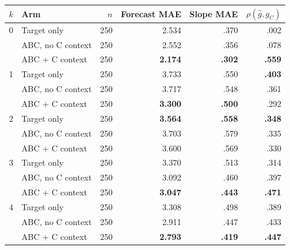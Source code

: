 \begin{center}
\begin{minipage}{\linewidth}
\centering
{}
\label{tab:coin-city-recovery-gemini}
\small
\begin{tabular}{c l r r r r}
\toprule
$k$ & Arm & $n$ & Forecast MAE & Slope MAE & $\rho(\hat g,g_C)$ \\
\midrule
0 & Target only & 250 & 2.534 & .370 & .002 \\
  & ABC, no C context & 250 & 2.552 & .356 & .078 \\
  & ABC + C context & 250 & \textbf{2.174} & \textbf{.302} & \textbf{.559} \\
\midrule
1 & Target only & 250 & 3.733 & .550 & \textbf{.403} \\
  & ABC, no C context & 250 & 3.717 & .548 & .361 \\
  & ABC + C context & 250 & \textbf{3.300} & \textbf{.500} & .292 \\
\midrule
2 & Target only & 250 & \textbf{3.564} & \textbf{.558} & \textbf{.348} \\
  & ABC, no C context & 250 & 3.703 & .579 & .335 \\
  & ABC + C context & 250 & 3.600 & .569 & .330 \\
\midrule
3 & Target only & 250 & 3.370 & .513 & .314 \\
  & ABC, no C context & 250 & 3.092 & .460 & .397 \\
  & ABC + C context & 250 & \textbf{3.047} & \textbf{.443} & \textbf{.471} \\
\midrule
4 & Target only & 250 & 3.308 & .498 & .389 \\
  & ABC, no C context & 250 & 2.911 & .447 & .433 \\
  & ABC + C context & 250 & \textbf{2.793} & \textbf{.419} & \textbf{.447} \\
\bottomrule
\end{tabular}
\end{minipage}
\end{center}


